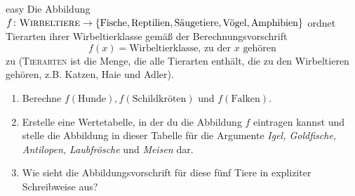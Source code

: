 \documentclass[../funktionen.tex]{subfiles}
\begin{document}
\begin{exercise}{easy}
    Die Abbildung $f\colon\textsc{Wirbeltiere}\rightarrow\{\text{Fische},\text{Reptilien},\text{Säugetiere},\text{Vögel},\text{Amphibien}\}$ ordnet Tierarten ihrer Wirbeltierklasse gemäß der Berechnungsvorschrift
    \[f(x)=\text{Wirbeltierklasse, zu der $x$ gehören}\]
    zu (\textsc{Tierarten} ist die Menge, die alle Tierarten enthält, die zu den Wirbeltieren gehören, z.B. Katzen, Haie und Adler).
    \begin{enumerate}
        \item Berechne $f(\text{Hunde}), f(\text{Schildkröten})$ und $f(\text{Falken})$.
        \item Erstelle eine Wertetabelle, in der du die Abbildung $f$ eintragen kannst und stelle die Abbildung in dieser Tabelle für die Argumente \emph{Igel, Goldfische, Antilopen, Laubfrösche} und \emph{Meisen} dar.
        \item Wie sieht die Abbildungsvorschrift für diese fünf Tiere in expliziter Schreibweise aus?
    \end{enumerate}
\end{exercise}
\end{document}
